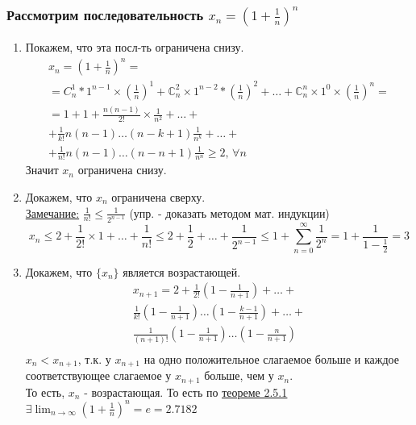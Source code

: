 \documentclass[12pt]{article}
\begin{document}
    \subsubsection*{Рассмотрим последовательность $x_n = (1+\frac{1}{n})^n$}
    \begin{enumerate}
        \item Покажем, что эта посл-ть ограничена снизу.
        \begin{gather*}
            x_n = (1 + \frac{1}{n})^n =\\
            = C^{1}_{n}*1^{n-1}\times(\frac{1}{n})^{1} + \mathbb{C}^{2}_{n}\times1^{n-2}*(\frac{1}{n})^{2} + \dots + \mathbb{C}^n_{n}\times1^{0}\times(\frac{1}{n})^n =\\
            = 1 + 1 + \frac{n(n-1)}{2!} \times \frac{1}{n^{2}} + \dots +\\
            + \frac{1}{k!}n(n-1)\dots(n-k+1)\frac{1}{n^{k}}+\dots+\\
            +\frac{1}{n!}n(n-1)\dots(n-n+1)\frac{1}{n^n} \ge 2 \text{, } \forall n
        \end{gather*}
        Значит $x_n$ ограничена снизу.
        \item Докажем, что $x_n$ ограничена сверху.\\
        \underline{Замечание:} $\frac{1}{n!} \le \frac{1}{2^{n-1}}$ (упр. - доказать методом мат. индукции)
        \begin{equation*}
            x_n \le 2 + \frac{1}{2!} \times 1 + \dots + \frac{1}{n!} \le 2 + \frac{1}{2} + \dots + \frac{1}{2^{n-1}} \le 1 + \sum_{n=0}^{\infty} \frac{1}{2^n} = 1 + \frac{1}{1-\frac{1}{2}} = 3
        \end{equation*}
        \item Докажем, что $\{x_n\}$ является возрастающей.\\
        \begin{gather*}
            x_{n+1} = 2 + \frac{1}{2!} (1 - \frac{1}{n+1}) + \dots +\\
            \frac{1}{k!} (1 - \frac{1}{n+1}) \dots (1 - \frac{k-1}{n+1}) + \dots +\\
            \frac{1}{(n+1)!} (1 - \frac{1}{n+1}) \dots (1 - \frac{n}{n+1})\\
        \end{gather*}
        $x_n < x_{n+1}$, т.к. у $x_{n+1}$ на одно положительное слагаемое больше и каждое соответствующее слагаемое у $x_{n+1}$ больше, чем у $x_n$.\\
        \indent То есть, $x_n$ - возрастающая. То есть по \underline{\hyperref[th:2.5.1]{теореме 2.5.1}} $\exists \lim_{n\to\infty}(1+\frac{1}{n})^n = e = 2.7182$
    \end{enumerate}
\end{document}
